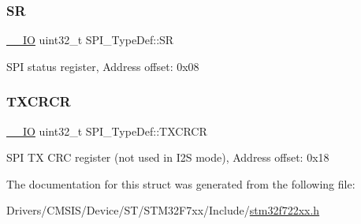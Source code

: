 \subsubsection{\texorpdfstring{SR}{SR}}
{\footnotesize\ttfamily \mbox{\hyperlink{core__sc300_8h_aec43007d9998a0a0e01faede4133d6be}{\+\_\+\+\_\+\+IO}} uint32\+\_\+t S\+P\+I\+\_\+\+Type\+Def\+::\+SR}

S\+PI status register, Address offset\+: 0x08 \mbox{\label{struct_s_p_i___type_def_a0b5a7f6383eb478bbcc22a36c5e95ae6}} 
\subsubsection{\texorpdfstring{TXCRCR}{TXCRCR}}
{\footnotesize\ttfamily \mbox{\hyperlink{core__sc300_8h_aec43007d9998a0a0e01faede4133d6be}{\+\_\+\+\_\+\+IO}} uint32\+\_\+t S\+P\+I\+\_\+\+Type\+Def\+::\+T\+X\+C\+R\+CR}

S\+PI TX C\+RC register (not used in I2S mode), Address offset\+: 0x18 

The documentation for this struct was generated from the following file\+:\begin{DoxyCompactItemize}
\item 
Drivers/\+C\+M\+S\+I\+S/\+Device/\+S\+T/\+S\+T\+M32\+F7xx/\+Include/\mbox{\hyperlink{stm32f722xx_8h}{stm32f722xx.\+h}}\end{DoxyCompactItemize}
